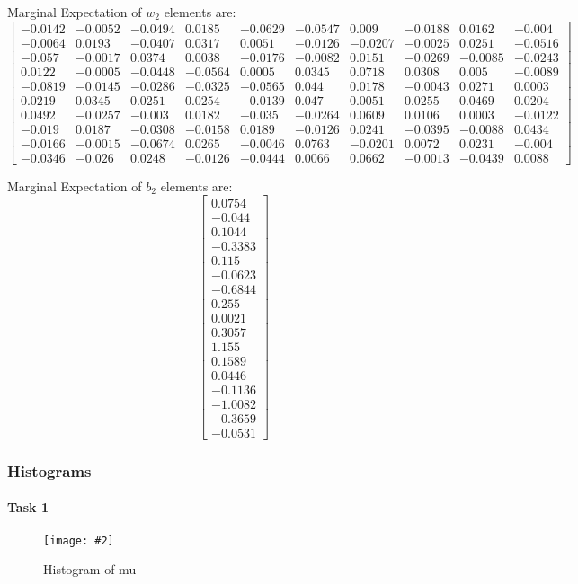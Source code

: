 \documentclass{article}
\newcommand{\centerfigcap}[3]{\begin{figure}[H]
\begin{center}\texttt{[image: \#2]} \caption{#3}\end{center}
\end{figure}}
\begin{document}
Marginal Expectation of $w_2$ elements are:
\[
\begin{bmatrix}
-0.0142&
-0.0052&
-0.0494&
0.0185&
-0.0629&
-0.0547&
0.009&
-0.0188&
0.0162&
-0.004\\
-0.0064&
0.0193&
-0.0407&
0.0317&
0.0051&
-0.0126&
-0.0207&
-0.0025&
0.0251&
-0.0516\\
-0.057&
-0.0017&
0.0374&
0.0038&
-0.0176&
-0.0082&
0.0151&
-0.0269&
-0.0085&
-0.0243\\
0.0122&
-0.0005&
-0.0448&
-0.0564&
0.0005&
0.0345&
0.0718&
0.0308&
0.005&
-0.0089\\
-0.0819&
-0.0145&
-0.0286&
-0.0325&
-0.0565&
0.044&
0.0178&
-0.0043&
0.0271&
0.0003\\
0.0219&
0.0345&
0.0251&
0.0254&
-0.0139&
0.047&
0.0051&
0.0255&
0.0469&
0.0204\\
0.0492&
-0.0257&
-0.003&
0.0182&
-0.035&
-0.0264&
0.0609&
0.0106&
0.0003&
-0.0122\\
-0.019&
0.0187&
-0.0308&
-0.0158&
0.0189&
-0.0126&
0.0241&
-0.0395&
-0.0088&
0.0434\\
-0.0166&
-0.0015&
-0.0674&
0.0265&
-0.0046&
0.0763&
-0.0201&
0.0072&
0.0231&
-0.004\\
-0.0346&
-0.026&
0.0248&
-0.0126&
-0.0444&
0.0066&
0.0662&
-0.0013&
-0.0439&
0.0088
\end{bmatrix}
\]

Marginal Expectation of $b_2$ elements are:
\[
\begin{bmatrix}
0.0754\\
-0.044\\
0.1044\\
-0.3383\\
0.115\\
-0.0623\\
-0.6844\\
0.255\\
0.0021\\
0.3057\\
1.155\\
0.1589\\
0.0446\\
-0.1136\\
-1.0082\\
-0.3659\\
-0.0531
\end{bmatrix}
\]
\subsubsection{Histograms}
\paragraph{Task 1}
\centerfigcap{0.6}{../Results/graph_1}{Histogram of mu}
\end{document}
